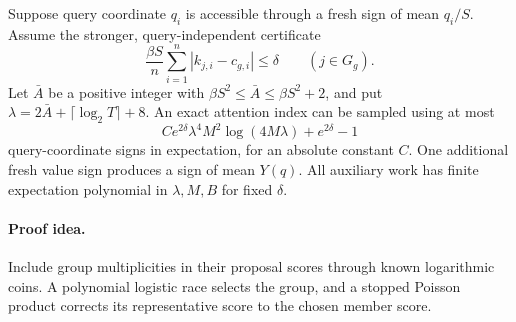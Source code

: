 \begin{theorem}
\label{thm:newimplicitcover}
Suppose query coordinate $q_i$ is accessible through a fresh sign
of mean $q_i/S$. Assume the stronger, query-independent certificate
\[
 \frac{\beta S}{n}\sum_{i=1}^n|k_{j,i}-c_{g,i}|\le\delta
 \qquad(j\in G_g).
\]
Let $\bar A$ be a positive integer with
$\beta S^2\le\bar A\le\beta S^2+2$, and put
$\lambda=2\bar A+\lceil\log_2T\rceil+8$.
An exact attention index can be sampled using at most
\[
 Ce^{2\delta}\lambda^4 M^2\log(4M\lambda)
       +e^{2\delta}-1
\]
query-coordinate signs in expectation, for an absolute constant $C$.
One additional fresh value
sign produces a sign of mean $Y(q)$. All auxiliary work has finite
expectation polynomial in $\lambda,M,B$ for fixed $\delta$.
\end{theorem}
\paragraph{Proof idea.}
Include group multiplicities in their proposal scores through known logarithmic coins.  A polynomial logistic race selects the group, and a stopped Poisson product corrects its representative score to the chosen member score.

